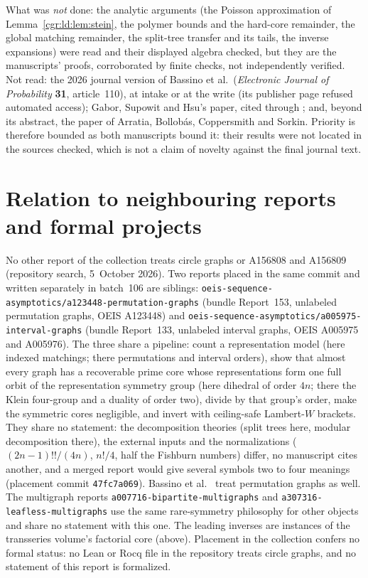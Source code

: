 \documentclass[11pt,letterpaper]{article}
\numberwithin{equation}{section}
\theoremstyle{definition}\newtheorem{definition}[theorem]{Definition}
\theoremstyle{remark}\newtheorem{remark}[theorem]{Remark}
\newcommand{\file}[1]{\nolinkurl{#1}}
\begin{document}
What was \emph{not} done: the analytic arguments (the Poisson approximation of Lemma~\ref{cgr:ld:lem:stein}, the polymer bounds and the hard-core remainder, the global matching remainder, the split-tree transfer and its tails, the inverse expansions) were read and their displayed algebra checked, but they are the manuscripts' proofs, corroborated by finite checks, not independently verified. Not read: the 2026 journal version of Bassino et al.\ (\emph{Electronic Journal of Probability} \textbf{31}, article~110), at intake or at the write (its publisher page refused automated access); Gabor, Supowit and Hsu's paper, cited through \cite[Proposition 5.12]{BBFGP24}; and, beyond its abstract, the paper of Arratia, Bollob\'as, Coppersmith and Sorkin. Priority is therefore bounded as both manuscripts bound it: their results were not located in the sources checked, which is not a claim of novelty against the final journal text.

\section*{Relation to neighbouring reports and formal projects}\label{cgr:sec:neighbours}
No other report of the collection treats circle graphs or A156808 and A156809 (repository search, 5~October 2026). Two reports placed in the same commit and written separately in batch~106 are siblings: \file{oeis-sequence-asymptotics/a123448-permutation-graphs} (bundle Report~153, unlabeled permutation graphs, OEIS A123448) and \file{oeis-sequence-asymptotics/a005975-interval-graphs} (bundle Report~133, unlabeled interval graphs, OEIS A005975 and A005976). The three share a pipeline: count a representation model (here indexed matchings; there permutations and interval orders), show that almost every graph has a recoverable prime core whose representations form one full orbit of the representation symmetry group (here dihedral of order $4n$; there the Klein four-group and a duality of order two), divide by that group's order, make the symmetric cores negligible, and invert with ceiling-safe Lambert-$W$ brackets. They share no statement: the decomposition theories (split trees here, modular decomposition there), the external inputs and the normalizations ($(2n-1)!!/(4n)$, $n!/4$, half the Fishburn numbers) differ, no manuscript cites another, and a merged report would give several symbols two to four meanings (placement commit \texttt{47fc7a069}). Bassino et al.\ \cite{BBFGP24} treat permutation graphs as well. The multigraph reports \file{a007716-bipartite-multigraphs} and \file{a307316-leafless-multigraphs} use the same rare-symmetry philosophy for other objects and share no statement with this one. The leading inverses are instances of the transseries volume's factorial core (above). Placement in the collection confers no formal status: no Lean or Rocq file in the repository treats circle graphs, and no statement of this report is formalized.
\clearpage
\end{document}
